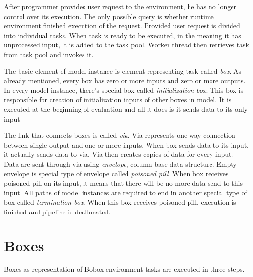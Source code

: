 After programmer provides user request to the environment, he has no longer control over its execution. The only possible query is whether runtime environment finished execution of the request. Provided user request is divided into individual tasks. When task is ready to be executed, in the meaning it has unprocessed input, it is added to the task pool. Worker thread then retrieves task from task pool and invokes it.

The basic element of model instance is element representing task called \textit{box}.  As already mentioned, every box has zero or more inputs and zero or more outputs. In every model instance, there's special box called \textit{initialization box}. This box is responsible for creation of initialization inputs of other boxes in model. It is executed at the beginning of evaluation and all it does is it sends data to its only input.

The link that connects boxes is called \textit{via}. Via represents one way connection between single output and one or more inputs. When box sends data to its input, it actually sends data to via. Via then creates copies of data for every input. Data are sent through via using \textit{envelope}, column base data structure. Empty envelope is special type of envelope called \textit{poisoned pill}. When box receives poisoned pill on its input, it means that there will be no more data send to this input. All paths of model instances are required to end in another special type of box called \textit{termination box}. When this box receives poisoned pill, execution is finished and pipeline is deallocated.

\section{Boxes}
Boxes as representation of Bobox environment tasks are executed in three steps.

